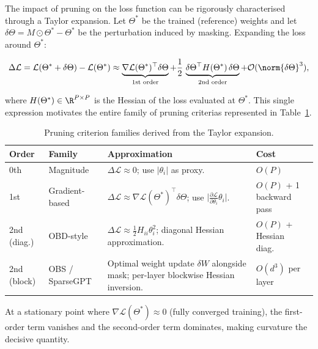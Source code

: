 The impact of pruning on the loss function can be rigorously characterised
through a Taylor expansion.  Let $\Theta^*$ be the trained (reference) weights
and let $\delta\Theta = M \odot \Theta^* - \Theta^*$ be the perturbation
induced by masking.  Expanding the loss around $\Theta^*$:

\begin{equation}
	\Delta\mathcal{L} = \mathcal{L}(\Theta^* + \delta\Theta)
	- \mathcal{L}(\Theta^*)
	\approx
	\underbrace{\nabla\mathcal{L}(\Theta^*)^\top \delta\Theta}_{\text{1st order}}
	+
	\frac{1}{2}\,\underbrace{\delta\Theta^\top H(\Theta^*)\,\delta\Theta}_{\text{2nd order}}
	+ \mathcal{O}(\norm{\delta\Theta}^3),
	\label{eq:taylor}
\end{equation}

where $H(\Theta^*) \in \R^{P \times P}$ is the Hessian of the loss evaluated
at $\Theta^*$.  This single expression motivates the entire family of pruning
criterias represented in Table~\ref{tab:criterion_families}.

\begin{table}[H]
	\centering
	\caption{Pruning criterion families derived from the Taylor expansion.}
	\label{tab:criterion_families}
	\renewcommand{\arraystretch}{1.5}
	\begin{tabularx}{\textwidth}{llXl}
		\toprule
		\textbf{Order} & \textbf{Family} & \textbf{Approximation}
		& \textbf{Cost} \\
		\midrule
		0th & Magnitude & $\Delta\mathcal{L} \approx 0$; use $|\theta_i|$ as proxy.
		& $O(P)$ \\[2pt]
		1st & Gradient-based &
		$\Delta\mathcal{L} \approx \nabla\mathcal{L}(\Theta^*)^\top\delta\Theta$;
		use $\bigl|\tfrac{\partial\mathcal{L}}{\partial\theta_i}\theta_i\bigr|$.
		& $O(P)$ + 1 backward pass \\[2pt]
		2nd (diag.) & OBD-style &
		$\Delta\mathcal{L} \approx \frac{1}{2} H_{ii}\theta_i^2$; diagonal
		Hessian approximation.
		& $O(P)$ + Hessian diag.\ \\[2pt]
		2nd (block) & OBS / SparseGPT &
		Optimal weight update $\delta W$ alongside mask;
		per-layer blockwise Hessian inversion.
		& $O(d^3)$ per layer\\
		\bottomrule
	\end{tabularx}
\end{table}

At a stationary point where $\nabla\mathcal{L}(\Theta^*) \approx 0$ (fully
converged training), the first-order term vanishes and the second-order
term dominates, making curvature the decisive quantity.

